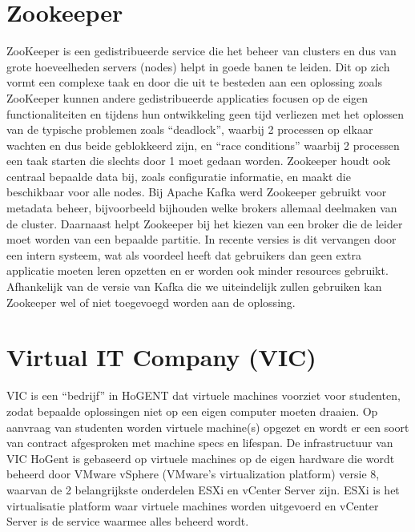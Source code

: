 \section{Zookeeper}
ZooKeeper is een gedistribueerde service die het beheer van clusters en dus van grote hoeveelheden servers (nodes) helpt in goede banen te leiden. Dit op zich vormt een complexe taak en door die uit te besteden aan een oplossing zoals ZooKeeper kunnen andere gedistribueerde applicaties focusen op de eigen functionaliteiten en tijdens hun ontwikkeling geen tijd verliezen met het oplossen van de typische problemen zoals ``deadlock'', waarbij 2 processen op elkaar wachten en dus beide geblokkeerd zijn, en ``race conditions'' waarbij 2 processen een taak starten die slechts door 1 moet gedaan worden.  
Zookeeper houdt ook centraal bepaalde data bij, zoals configuratie informatie, en maakt die beschikbaar voor alle nodes.\textcite{ASF2023}
\newline
\newline 
Bij Apache Kafka werd Zookeeper gebruikt voor metadata beheer, bijvoorbeeld bijhouden welke brokers allemaal deelmaken van de cluster. Daarnaast helpt Zookeeper bij het kiezen van een broker die de leider moet worden van een bepaalde partitie. In recente versies is dit vervangen door een intern systeem, wat als voordeel heeft dat gebruikers dan geen extra applicatie moeten leren opzetten en er worden ook minder resources gebruikt.
\textcite{Conduktor2023}
\newline
\newline
Afhankelijk van de versie van Kafka die we uiteindelijk zullen gebruiken kan Zookeeper wel of niet toegevoegd worden aan de oplossing.
\newline
\newline

\section{Virtual IT Company (VIC)}
VIC is een ``bedrijf'' in HoGENT dat virtuele machines voorziet voor studenten, zodat bepaalde oplossingen niet op een eigen computer moeten draaien. Op aanvraag van studenten worden virtuele machine(s) opgezet en wordt er een soort van contract afgesproken met machine specs en lifespan.
\newline
\newline
De infrastructuur van VIC HoGent is gebaseerd op virtuele machines op de eigen hardware die wordt beheerd door VMware vSphere (VMware's virtualization platform) versie 8, waarvan de 2 belangrijkste onderdelen ESXi en vCenter Server zijn. ESXi is het virtualisatie platform waar virtuele machines worden uitgevoerd en vCenter Server is de service waarmee alles beheerd wordt.

